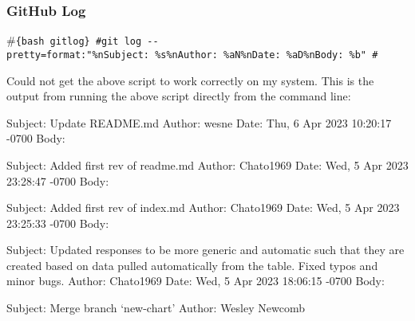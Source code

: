 \documentclass[
]{article}
\begin{document}
\hypertarget{github-log}{%
\subsubsection{GitHub Log}\label{github-log}}

\#\texttt{\{bash\ gitlog\}\ \#git\ log\ -\/-pretty=format:"\%nSubject:\ \%s\%nAuthor:\ \%aN\%nDate:\ \%aD\%nBody:\ \%b"\ \#}

Could not get the above script to work correctly on my system. This is
the output from running the above script directly from the command line:

Subject: Update README.md Author: wesne Date: Thu, 6 Apr 2023 10:20:17
-0700 Body:

Subject: Added first rev of readme.md Author: Chato1969 Date: Wed, 5 Apr
2023 23:28:47 -0700 Body:

Subject: Added first rev of index.md Author: Chato1969 Date: Wed, 5 Apr
2023 23:25:33 -0700 Body:

Subject: Updated responses to be more generic and automatic such that
they are created based on data pulled automatically from the table.
Fixed typos and minor bugs. Author: Chato1969 Date: Wed, 5 Apr 2023
18:06:15 -0700 Body:

Subject: Merge branch `new-chart' Author: Wesley Newcomb
\end{document}
